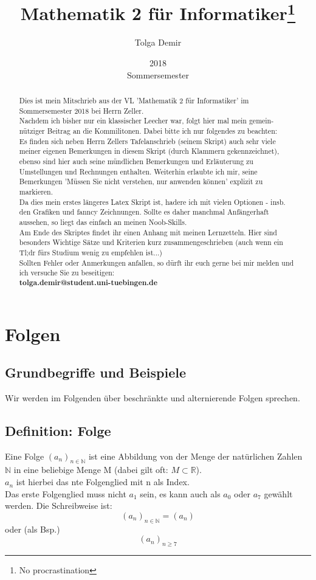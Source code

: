 \documentclass[12pt]{article}
\title{Mathematik 2 für Informatiker\thanks{No procrastination}}
\date{2018\\ Sommersemester}
\author{Tolga Demir}
\begin{document}
\maketitle
	\newpage

\begin{abstract}
	Dies ist mein Mitschrieb aus der VL 'Mathematik 2 für Informatiker' im Sommersemester 2018 bei Herrn Zeller. \\
	
	Nachdem ich bisher nur ein klassischer Leecher war, folgt hier mal mein gemein- nütziger Beitrag an die Kommilitonen. Dabei bitte ich nur folgendes zu beachten:\\
	Es finden sich neben Herrn Zellers Tafelanschrieb (seinem Skript) auch sehr viele meiner eigenen Bemerkungen in diesem Skript (durch Klammern gekennzeichnet), ebenso sind hier auch seine mündlichen Bemerkungen und Erläuterung zu Umstellungen und Rechnungen enthalten. Weiterhin erlaubte ich mir, seine Bemerkungen 'Müssen Sie nicht verstehen, nur anwenden können' explizit zu markieren. \\
	Da dies mein erstes längeres Latex Skript ist, hadere ich mit vielen Optionen - insb. den Grafiken und fanncy Zeichnungen. Sollte es daher manchmal Anfängerhaft aussehen, so liegt das einfach an meinen Noob-Skills. \\
	Am Ende des Skriptes findet ihr einen Anhang mit meinen Lernzetteln. Hier sind besonders Wichtige Sätze und Kriterien kurz zusammengeschrieben (auch wenn ein Tl;dr fürs Studium wenig zu empfehlen ist...)\\
	Sollten Fehler oder Anmerkungen anfallen, so dürft ihr euch gerne bei mir melden und ich versuche Sie zu beseitigen: \\
	\textbf{tolga.demir@student.uni-tuebingen.de}
	
\end{abstract}
	\newpage

\tableofcontents
	\newpage
\section{Folgen}

\subsection{Grundbegriffe und Beispiele}
Wir werden im Folgenden über beschränkte und alternierende Folgen sprechen. 

\subsection{Definition: Folge}
		Eine Folge $(a_n)_{n\in \mathbb{N}}$ ist eine Abbildung von der Menge der natürlichen Zahlen $\mathbb{N}$ in eine beliebige Menge M (dabei gilt oft: $M \subset \mathbb{R}$).\\
		$a_n$ ist hierbei das nte Folgenglied mit n als Index. \\
		Das erste Folgenglied muss nicht $a_1$ sein, es kann auch als $a_0$ oder $a_7$ gewählt werden. Die Schreibweise ist:
		$$(a_n)_{n\in \mathbb{N}} = (a_n) $$ oder (als Bsp.) $$(a_n)_{n \geq 7}$$
\end{document}
